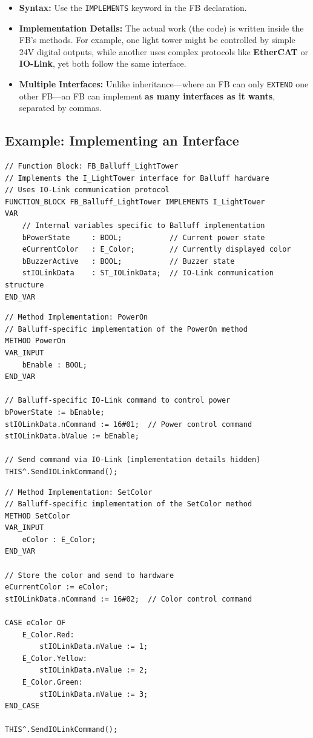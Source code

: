\documentclass[11pt,a4paper]{article}
\begin{document}
\begin{itemize}[leftmargin=*]
    \item \textbf{Syntax:} Use the \texttt{IMPLEMENTS} keyword in the FB declaration.
    
    \item \textbf{Implementation Details:} The actual work (the code) is written inside the FB's methods. For example, one light tower might be controlled by simple 24V digital outputs, while another uses complex protocols like \textbf{EtherCAT} or \textbf{IO-Link}, yet both follow the same interface.
    
    \item \textbf{Multiple Interfaces:} Unlike inheritance---where an FB can only \texttt{EXTEND} one other FB---an FB can implement \textbf{as many interfaces as it wants}, separated by commas.
\end{itemize}

\subsection*{Example: Implementing an Interface}

\begin{lstlisting}
// Function Block: FB_Balluff_LightTower
// Implements the I_LightTower interface for Balluff hardware
// Uses IO-Link communication protocol
FUNCTION_BLOCK FB_Balluff_LightTower IMPLEMENTS I_LightTower
VAR
    // Internal variables specific to Balluff implementation
    bPowerState     : BOOL;           // Current power state
    eCurrentColor   : E_Color;        // Currently displayed color
    bBuzzerActive   : BOOL;           // Buzzer state
    stIOLinkData    : ST_IOLinkData;  // IO-Link communication structure
END_VAR
\end{lstlisting}

\begin{lstlisting}
// Method Implementation: PowerOn
// Balluff-specific implementation of the PowerOn method
METHOD PowerOn
VAR_INPUT
    bEnable : BOOL;
END_VAR

// Balluff-specific IO-Link command to control power
bPowerState := bEnable;
stIOLinkData.nCommand := 16#01;  // Power control command
stIOLinkData.bValue := bEnable;

// Send command via IO-Link (implementation details hidden)
THIS^.SendIOLinkCommand();
\end{lstlisting}

\begin{lstlisting}
// Method Implementation: SetColor
// Balluff-specific implementation of the SetColor method
METHOD SetColor
VAR_INPUT
    eColor : E_Color;
END_VAR

// Store the color and send to hardware
eCurrentColor := eColor;
stIOLinkData.nCommand := 16#02;  // Color control command

CASE eColor OF
    E_Color.Red:
        stIOLinkData.nValue := 1;
    E_Color.Yellow:
        stIOLinkData.nValue := 2;
    E_Color.Green:
        stIOLinkData.nValue := 3;
END_CASE

THIS^.SendIOLinkCommand();
\end{lstlisting}
\end{document}
